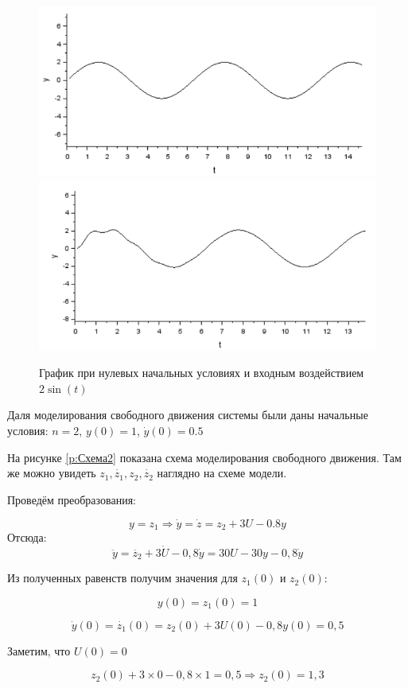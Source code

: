 \documentclass[a4paper, 12pt]{article}
\begin{document}
\begin{figure}[h!]
	\centering
	\includegraphics[scale=0.7]{plot1_4}
	\includegraphics[scale=0.7]{plot1_2}
	\caption{График при нулевых начальных условиях и входным воздействием $2\sin(t)$ }
	\label{p:График1_2}
\end{figure}  

Даля моделирования свободного движения системы были даны начальные условия: $n=2$, $y(0)=1$, $\dot{y}(0)=0.5$ 

На рисунке \ref{p:Схема2} показана схема моделирования свободного движения. Там же можно увидеть $ z_1, \dot{z_1}, z_2, \dot{z_2} $ наглядно на схеме модели.

Проведём преобразования: 

$$ y = z_1 \Rightarrow \dot{y} = \dot{z} = z_2 +3U - 0.8y $$
Отсюда:
$$ \ddot{y} = \ddot{z_2} + 3\dot{U} -0,8\dot{y} = 30U - 30y - 0,8\dot{y}$$ 

Из полученных равенств получим значения для $z_1(0)$ и $z_2(0)$:

$$ y(0) = z_1(0) = 1 $$

$$ \dot{y}(0) = \dot{z_1}(0) = z_2(0) + 3U(0) - 0,8y(0) = 0,5 $$

Заметим, что $U(0)=0$

$$ z_2(0) + 3 \times 0 - 0,8 \times 1 = 0,5 \Rightarrow z_2(0) = 1,3 $$
\end{document}
